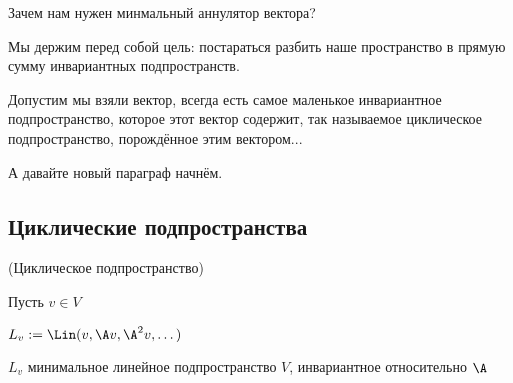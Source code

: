 \vspace*{5mm}

Зачем нам нужен минмальный аннулятор вектора?

Мы держим перед собой цель: постараться разбить наше пространство в прямую сумму инвариантных подпространств.

Допустим мы взяли вектор, всегда есть самое маленькое инвариантное подпространство,
которое этот вектор содержит, так называемое циклическое подпространство, порождённое этим вектором...

А давайте новый параграф начнём.

\subsection{Циклические подпространства}

\begin{conj}(Циклическое подпространство)

    Пусть $ v \in V  $

    $ L_v := \Lin (v, \A v, \A^2 v, \dots ) $

    $ L_v $  минимальное линейное подпространство $V$, инвариантное относительно $\A$

\end{conj}

